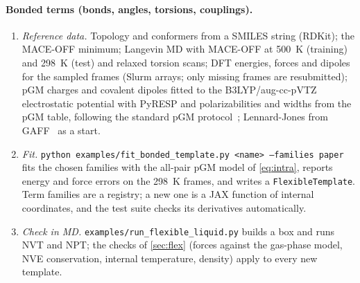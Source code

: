 \documentclass[11pt]{article}
\newcommand{\code}[1]{\texttt{#1}}
\begin{document}
\paragraph{Bonded terms (bonds, angles, torsions, couplings).}
\begin{enumerate}[nosep,leftmargin=*]
\item \emph{Reference data.} Topology and conformers from a SMILES string (RDKit); the MACE-OFF
minimum; Langevin MD with MACE-OFF at 500~K (training) and 298~K (test) and relaxed torsion scans;
DFT energies, forces and dipoles for the sampled frames (Slurm arrays; only missing frames are
resubmitted); pGM charges and covalent dipoles fitted to the B3LYP/aug-cc-pVTZ electrostatic
potential with PyRESP and polarizabilities and widths from the pGM table, following the standard
pGM protocol~\cite{wang2019pgm1,zhao2022pyresp}; Lennard-Jones from GAFF~\cite{wang2004gaff} as a
start.
\item \emph{Fit.} \code{python examples/fit\_bonded\_template.py <name> --families paper} fits the
chosen families with the all-pair pGM model of \cref{eq:intra}, reports energy and force errors
on the 298~K frames, and writes a \code{FlexibleTemplate}. Term families are a registry; a new one is
a JAX function of internal coordinates, and the test suite checks its derivatives automatically.
\item \emph{Check in MD.} \code{examples/run\_flexible\_liquid.py} builds a box and runs NVT and NPT;
the checks of \cref{sec:flex} (forces against the gas-phase model, NVE conservation, internal
temperature, density) apply to every new template.
\end{enumerate}
\end{document}
